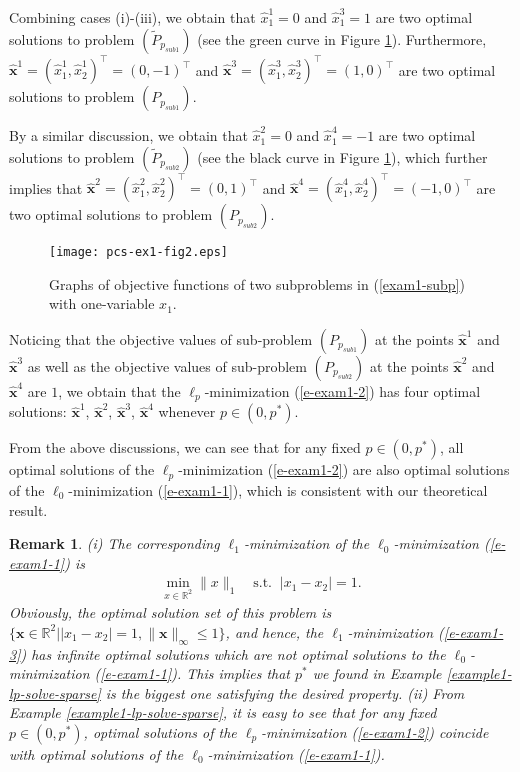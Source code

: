 \documentclass[12pt]{article}
\newtheorem{Remark}{Remark}[part]
\begin{document}
Combining cases (i)-(iii), we obtain that $\hat{x}^1_1=0$ and $\hat{x}^3_1=1$ are two optimal solutions to problem $(\tilde{P}_{p_{sub1}})$ (see the green curve in Figure \ref{examples1-2}). Furthermore, $\hat{\mathbf{x}}^1=(\hat{x}^1_1,\hat{x}^1_2)^\top=(0,-1)^\top$ and $\hat{\mathbf{x}}^3=(\hat{x}^3_1,\hat{x}^3_2)^\top=(1,0)^\top$ are two optimal solutions to problem $(P_{p_{sub1}})$.

By a similar discussion, we obtain that $\hat{x}^2_1=0$ and $\hat{x}^4_1=-1$ are two optimal solutions to problem $(\tilde{P}_{p_{sub2}})$ (see the black curve in Figure \ref{examples1-2}), which further implies that $\hat{\mathbf{x}}^2=(\hat{x}^2_1,\hat{x}^2_2)^\top=(0,1)^\top$ and $\hat{\mathbf{x}}^4=(\hat{x}^4_1,\hat{x}^4_2)^\top=(-1,0)^\top$ are two optimal solutions to problem $(P_{p_{sub2}})$.

\begin{figure}[ht]
\centering
\texttt{[image: pcs-ex1-fig2.eps]}
\caption{Graphs of objective functions of two subproblems in (\ref{exam1-subp}) with one-variable $x_1$.}
\label{examples1-2}
\end{figure}

Noticing that the objective values of sub-problem $(P_{p_{sub1}})$ at the points $\hat{\mathbf{x}}^1$ and $\hat{\mathbf{x}}^3$ as well as the objective values of sub-problem $(P_{p_{sub2}})$ at the points $\hat{\mathbf{x}}^2$ and $\hat{\mathbf{x}}^4$ are $1$, we obtain that the $\ell_p$-minimization (\ref{e-exam1-2}) has four optimal solutions: $\hat{\mathbf{x}}^1$, $\hat{\mathbf{x}}^2$, $\hat{\mathbf{x}}^3$, $\hat{\mathbf{x}}^4$ whenever $p\in (0,p^\ast)$.

From the above discussions, we can see that for any fixed $p\in (0,p^\ast)$, all optimal solutions of the $\ell_p$-minimization (\ref{e-exam1-2}) are also optimal solutions of the $\ell_0$-minimization (\ref{e-exam1-1}), which is consistent with our theoretical result.

\begin{Remark}
(i) The corresponding $\ell_1$-minimization of the $\ell_0$-minimization (\ref{e-exam1-1}) is
\begin{eqnarray}\label{e-exam1-3}
\min\limits_{x\in \mathbb{R}^2}\| x \|_1\quad \textrm{s.t.}\;\; |x_1-x_2|=1.
\end{eqnarray}
Obviously, the optimal solution set of this problem is $\{\textbf{x}\in \mathbb{R}^2| |x_1-x_2|=1, \|\textbf{x}\|_\infty\leqslant 1\}$, and hence, the $\ell_1$-minimization (\ref{e-exam1-3}) has infinite optimal solutions which are not optimal solutions to the $\ell_0$-minimization (\ref{e-exam1-1}). This implies that $p^\ast$ we found in Example \ref{example1-lp-solve-sparse} is the biggest one satisfying the desired property. (ii) From Example \ref{example1-lp-solve-sparse}, it is easy to see that for any fixed $p\in (0,p^\ast)$, optimal solutions of the $\ell_p$-minimization (\ref{e-exam1-2}) coincide with optimal solutions of the $\ell_0$-minimization (\ref{e-exam1-1}).
\end{Remark}
\end{document}
